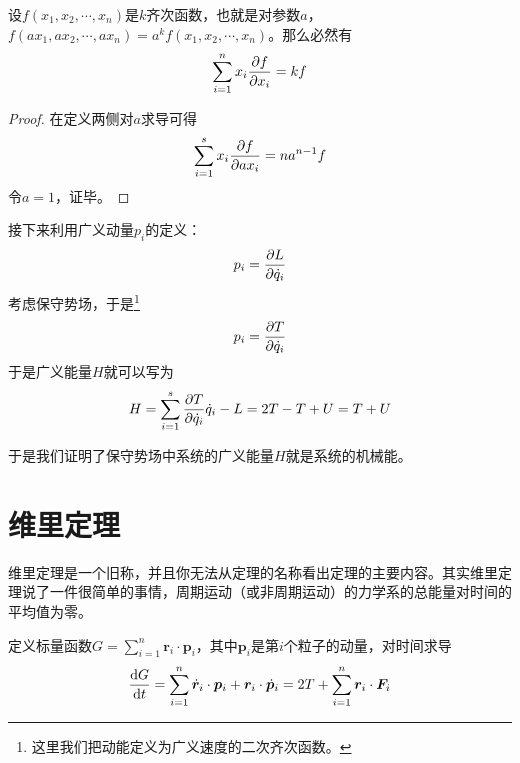             \begin{lemma}[齐次函数的欧拉定理]
                设$f(x_1,x_2,\cdots,x_n)$是$k$齐次函数，也就是对参数$a$，$f(ax_1,ax_2,\cdots,ax_n)=a^kf(x_1,x_2,\cdots,x_n)$。那么必然有
                \[
                \sum_{i=1}^{n}x_i\pdv{f}{x_i} = kf
                \]
            \end{lemma}
            \begin{proof}
                在定义两侧对$a$求导可得
                \[
                \sum_{i=1}^{s}x_i\pdv{f}{ax_i}=na^{n-1}f
                \]
                令$a=1$，证毕。
            \end{proof}

            接下来利用广义动量$p_i$的定义：
            \begin{equation}
                p_i = \pdv{L}{\dot{q}_i}
            \end{equation}
            考虑保守势场，于是\footnote{这里我们把动能定义为广义速度的二次齐次函数。}
            \begin{equation}
                p_i = \pdv{T}{\dot{q}_i}
            \end{equation}
            于是广义能量$H$就可以写为
            \begin{equation}
                H = \sum_{i=1}^{s}\pdv{T}{\dot{q}_i}\dot{q}_i - L = 2T-T+U = T+U
            \end{equation}
            
            于是我们证明了保守势场中系统的广义能量$H$就是系统的机械能。

        \section{维里定理}
        维里定理是一个旧称，并且你无法从定理的名称看出定理的主要内容。其实维里定理说了一件很简单的事情，周期运动（或非周期运动）的力学系的总能量对时间的平均值为零。

        定义标量函数$G=\sum_{i=1}^{n}\bm{r}_i\cdot\bm{p}_i$，其中$\bm{p}_i$是第$i$个粒子的动量，对时间求导
        \begin{equation}
            \dv{G}{t}=\sum_{i=1}^{n}\dot{\bm{r}}_i\cdot\bm{p}_i+\bm{r}_i\cdot\dot{\bm{p}}_i = 2T+\sum_{i=1}^{n}\bm{r}_i\cdot\bm{F}_i
        \end{equation}

